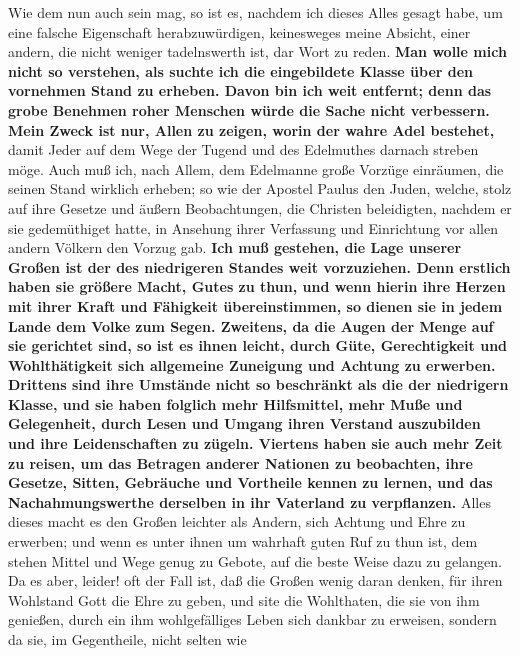 Wie dem nun auch sein mag, so ist es, nachdem ich dieses Alles gesagt habe, um
eine falsche Eigenschaft herabzuwürdigen, keinesweges meine Absicht, einer
andern, die nicht weniger tadelnswerth ist, dar Wort zu reden. \textbf{Man wolle
mich
nicht so verstehen, als suchte ich die eingebildete
Klasse über den vornehmen
Stand zu erheben. Davon bin ich weit entfernt; denn das grobe
Benehmen roher
Menschen würde die Sache nicht verbessern. Mein Zweck ist nur, Allen zu zeigen,
worin der wahre Adel bestehet,} damit Jeder auf dem Wege der Tugend und des
Edelmuthes darnach streben möge. Auch muß ich, nach Allem, dem Edelmanne große
Vorzüge einräumen, die seinen Stand wirklich erheben; so wie der Apostel
Paulus
den Juden, welche, stolz auf ihre Gesetze und äußern
Beobachtungen, die Christen
beleidigten, nachdem er sie gedemüthiget hatte, in Ansehung ihrer Verfassung und
Einrichtung vor allen andern Völkern den Vorzug gab. \textbf{Ich muß gestehen,
die Lage
unserer  Großen ist der des niedrigeren
Standes weit vorzuziehen. Denn erstlich
haben sie größere Macht, Gutes zu thun, und wenn hierin ihre Herzen mit ihrer
Kraft und Fähigkeit übereinstimmen, so dienen sie in jedem Lande dem Volke zum
Segen. Zweitens, da die Augen der Menge auf sie gerichtet sind, so ist es ihnen
leicht, durch Güte, Gerechtigkeit und Wohlthätigkeit sich
allgemeine Zuneigung
und Achtung zu erwerben. Drittens sind ihre Umstände nicht so beschränkt als die
der niedrigern Klasse, und sie haben folglich mehr Hilfsmittel, mehr
Muße und
Gelegenheit, durch Lesen und Umgang ihren Verstand
auszubilden und ihre
Leidenschaften zu zügeln. Viertens haben sie auch mehr Zeit zu
reisen, um das
Betragen anderer Nationen zu beobachten, ihre Gesetze, Sitten, Gebräuche und
Vortheile kennen zu lernen, und das Nachahmungswerthe derselben in ihr Vaterland
zu verpflanzen.} Alles dieses macht es den Großen leichter als Andern, sich
Achtung und Ehre zu erwerben; und wenn es unter ihnen um wahrhaft guten Ruf zu
thun ist, dem stehen Mittel und Wege genug zu Gebote, auf die beste Weise dazu
zu gelangen. Da es aber, leider! oft der Fall ist, daß die Großen wenig daran
denken, für ihren Wohlstand Gott die Ehre zu geben, und site die Wohlthaten, die
sie von ihm genießen, durch ein ihm wohlgefälliges Leben sich dankbar zu
erweisen, sondern da sie, im Gegentheile, nicht selten wie

